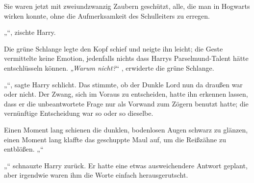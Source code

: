 Sie waren jetzt mit zweiundzwanzig Zaubern geschützt, alle, die man in Hogwarts wirken konnte, ohne die Aufmerksamkeit des Schulleiters zu erregen.

„“, zischte Harry.

Die grüne Schlange legte den Kopf schief und neigte ihn leicht; die Geste vermittelte keine Emotion, jedenfalls nichts dass Harrys Parselmund-Talent hätte entschlüsseln können. \emph{„Warum nicht?}“ , erwiderte die grüne Schlange.

„“, sagte Harry schlicht. Das stimmte, ob der Dunkle Lord nun da draußen war oder nicht. Der Zwang, sich im Voraus zu entscheiden, hatte ihn erkennen lassen, dass er die unbeantwortete Frage nur als Vorwand zum Zögern benutzt hatte; die vernünftige Entscheidung war so oder so dieselbe.

Einen Moment lang schienen die dunklen, bodenlosen Augen schwarz zu glänzen, einen Moment lang klaffte das geschuppte Maul auf, um die Reißzähne zu entblößen. „“

„“ schnauzte Harry zurück. Er hatte eine etwas ausweichendere Antwort geplant, aber irgendwie waren ihm die Worte einfach herausgerutscht.

